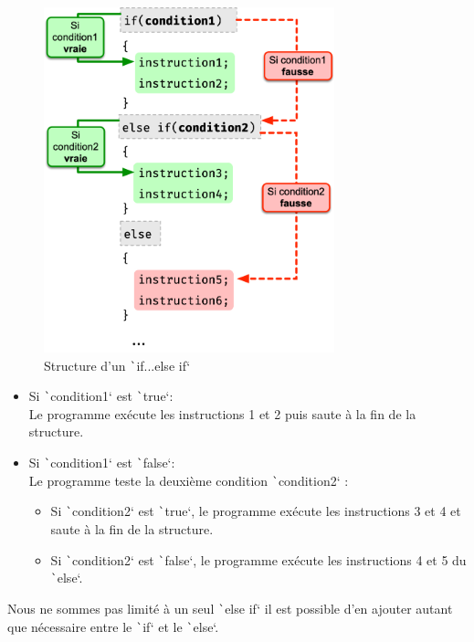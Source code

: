 \documentclass[10pt]{article}
\begin{document}
\begin{multicols}{2}
\begin{figure}[H]
    \includegraphics[max height=10cm,max width = \textwidth/2]{assets/ifElseIf.jpg}
    \centering
    \caption{Structure d'un \texttt`if...else if`}
    \label{structIfElseIf}
\end{figure}

\begin{itemize}
    \item Si \texttt`condition1` est \texttt`true`:\\  Le programme exécute les instructions 1 et 2 puis saute à la fin de la structure.
    \item Si \texttt`condition1` est \texttt`false`:\\ Le programme teste la deuxième condition \texttt`condition2` :
    \begin{itemize}
        \item Si \texttt`condition2` est \texttt`true`, le programme exécute les instructions 3 et 4 et saute à la fin de la structure.
        \item Si \texttt`condition2` est \texttt`false`, le programme exécute les instructions 4 et 5 du \texttt`else`. 
    \end{itemize}
\end{itemize}
\end{multicols}

\begin{noteblock}
    Nous ne sommes pas limité à un seul \texttt`else if` il est possible d'en ajouter autant que nécessaire entre le \texttt`if` et le \texttt`else`.
\end{noteblock}
\end{document}
